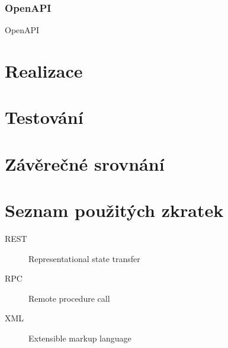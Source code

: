 \documentclass[thesis=M,czech]{FITthesis}[2019/12/23]
\begin{document}
\subsection{OpenAPI}
OpenAPI 

\chapter{}

\chapter{Realizace}

\chapter{Testování}

\chapter{Závěrečné srovnání}

\begin{conclusion}
\end{conclusion}




\appendix

\chapter{Seznam použitých zkratek}
\begin{description}
	\item[REST] Representational state transfer
	\item[RPC] Remote procedure call
	\item[XML] Extensible markup language
\end{description}
\end{document}
